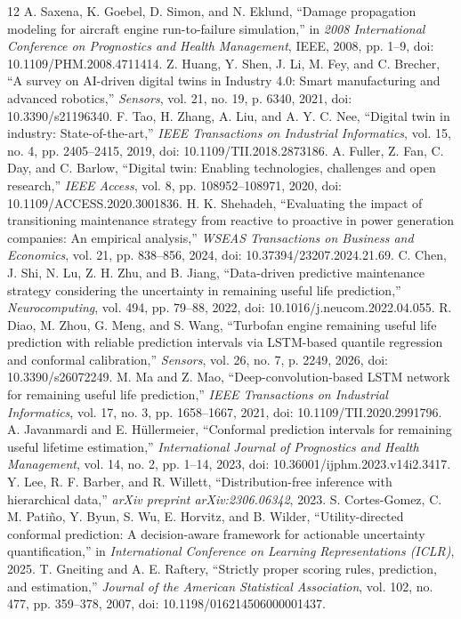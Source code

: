 \documentclass[12pt,a4paper]{article}
\begin{document}
\begin{thebibliography}{12}
 A. Saxena, K. Goebel, D. Simon, and N. Eklund, ``Damage propagation modeling for aircraft engine run-to-failure simulation,'' in \textit{2008 International Conference on Prognostics and Health Management}, IEEE, 2008, pp. 1--9, doi: 10.1109/PHM.2008.4711414.
 Z. Huang, Y. Shen, J. Li, M. Fey, and C. Brecher, ``A survey on AI-driven digital twins in Industry 4.0: Smart manufacturing and advanced robotics,'' \textit{Sensors}, vol. 21, no. 19, p. 6340, 2021, doi: 10.3390/s21196340.
 F. Tao, H. Zhang, A. Liu, and A. Y. C. Nee, ``Digital twin in industry: State-of-the-art,'' \textit{IEEE Transactions on Industrial Informatics}, vol. 15, no. 4, pp. 2405--2415, 2019, doi: 10.1109/TII.2018.2873186.
 A. Fuller, Z. Fan, C. Day, and C. Barlow, ``Digital twin: Enabling technologies, challenges and open research,'' \textit{IEEE Access}, vol. 8, pp. 108952--108971, 2020, doi: 10.1109/ACCESS.2020.3001836.
 H. K. Shehadeh, ``Evaluating the impact of transitioning maintenance strategy from reactive to proactive in power generation companies: An empirical analysis,'' \textit{WSEAS Transactions on Business and Economics}, vol. 21, pp. 838--856, 2024, doi: 10.37394/23207.2024.21.69.
 C. Chen, J. Shi, N. Lu, Z. H. Zhu, and B. Jiang, ``Data-driven predictive maintenance strategy considering the uncertainty in remaining useful life prediction,'' \textit{Neurocomputing}, vol. 494, pp. 79--88, 2022, doi: 10.1016/j.neucom.2022.04.055.
 R. Diao, M. Zhou, G. Meng, and S. Wang, ``Turbofan engine remaining useful life prediction with reliable prediction intervals via LSTM-based quantile regression and conformal calibration,'' \textit{Sensors}, vol. 26, no. 7, p. 2249, 2026, doi: 10.3390/s26072249.
 M. Ma and Z. Mao, ``Deep-convolution-based LSTM network for remaining useful life prediction,'' \textit{IEEE Transactions on Industrial Informatics}, vol. 17, no. 3, pp. 1658--1667, 2021, doi: 10.1109/TII.2020.2991796.
 A. Javanmardi and E. H{\"u}llermeier, ``Conformal prediction intervals for remaining useful lifetime estimation,'' \textit{International Journal of Prognostics and Health Management}, vol. 14, no. 2, pp. 1--14, 2023, doi: 10.36001/ijphm.2023.v14i2.3417.
 Y. Lee, R. F. Barber, and R. Willett, ``Distribution-free inference with hierarchical data,'' \textit{arXiv preprint arXiv:2306.06342}, 2023.
 S. Cortes-Gomez, C. M. Pati{\~n}o, Y. Byun, S. Wu, E. Horvitz, and B. Wilder, ``Utility-directed conformal prediction: A decision-aware framework for actionable uncertainty quantification,'' in \textit{International Conference on Learning Representations (ICLR)}, 2025.
 T. Gneiting and A. E. Raftery, ``Strictly proper scoring rules, prediction, and estimation,'' \textit{Journal of the American Statistical Association}, vol. 102, no. 477, pp. 359--378, 2007, doi: 10.1198/016214506000001437.
\end{thebibliography}
\end{document}
